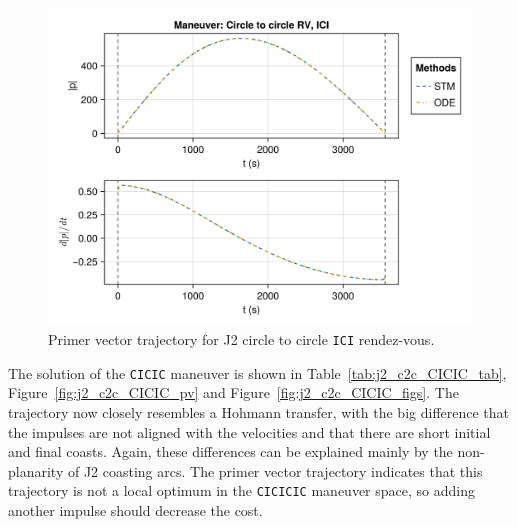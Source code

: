 \begin{figure}[htbp]
    \centering
    \includegraphics[width=\linewidth]{../results/j2/hohmann/ICI_primer_vector.png}
    \caption{Primer vector trajectory for J2 circle to circle \texttt{ICI} rendez-vous.}
    \label{fig:j2_c2c_ICI_pv}
\end{figure}

The solution of the \texttt{CICIC} maneuver is shown in Table~\ref{tab:j2_c2c_CICIC_tab}, Figure~\ref{fig:j2_c2c_CICIC_pv} and Figure~\ref{fig:j2_c2c_CICIC_figs}. The trajectory now closely resembles a Hohmann transfer, with the big difference that the impulses are not aligned with the velocities and that there are short initial and final coasts. Again, these differences can be explained mainly by the non-planarity of J2 coasting arcs. The primer vector trajectory indicates that this trajectory is not a local optimum in the \texttt{CICICIC} maneuver space, so adding another impulse should decrease the cost.

